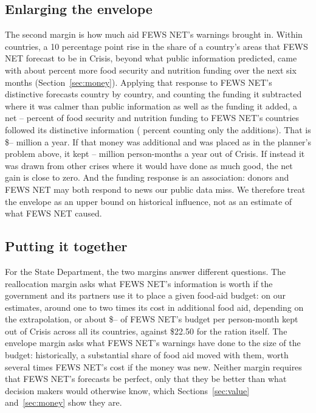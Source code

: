 \documentclass[11pt]{article}
\begin{document}
\subsection{Enlarging the envelope}

The second margin is how much aid FEWS NET's warnings brought in. Within countries, a 10 percentage point rise in the share of a country's areas that FEWS NET forecast to be in Crisis, beyond what public information predicted, came with about \envBeta{} percent more food security and nutrition funding over the next six months (Section~\ref{sec:money}). Applying that response to FEWS NET's distinctive forecasts country by country, and counting the funding it subtracted where it was calmer than public information as well as the funding it added, a net \envShareIpc{}--\envShareRaw{} percent of food security and nutrition funding to FEWS NET's countries followed its distinctive information (\envSharePosRaw{} percent counting only the additions). That is \$\envUsdLo{}--\envUsdHi{} million a year. If that money was additional and was placed as in the planner's problem above, it kept \envPmLo{}--\envPmHi{} million person-months a year out of Crisis. If instead it was drawn from other crises where it would have done as much good, the net gain is close to zero. And the funding response is an association: donors and FEWS NET may both respond to news our public data miss. We therefore treat the envelope as an upper bound on historical influence, not as an estimate of what FEWS NET caused.

\subsection{Putting it together}

For the State Department, the two margins answer different questions. The reallocation margin asks what FEWS NET's information is worth if the government and its partners use it to place a given food-aid budget: on our estimates, around one to two times its cost in additional food aid, depending on the extrapolation, or about \$\vmRandCostPm{}--\vmHalfCostPm{} of FEWS NET's budget per person-month kept out of Crisis across all its countries, against \$22.50 for the ration itself. The envelope margin asks what FEWS NET's warnings have done to the size of the budget: historically, a substantial share of food aid moved with them, worth several times FEWS NET's cost if the money was new. Neither margin requires that FEWS NET's forecasts be perfect, only that they be better than what decision makers would otherwise know, which Sections~\ref{sec:value} and~\ref{sec:money} show they are.
\end{document}
